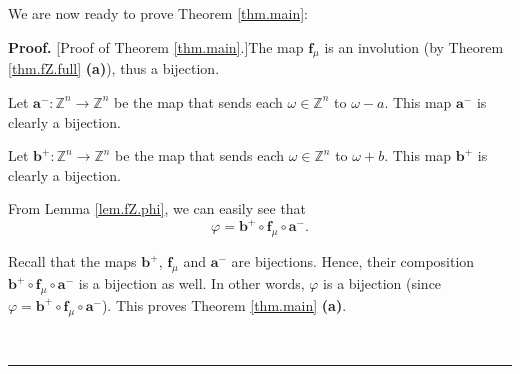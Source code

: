 \documentclass[numbers=enddot,12pt,final,onecolumn,notitlepage]{scrartcl}%
\theoremstyle{definition}
\newenvironment{proof}[1][Proof]{\noindent\textbf{#1.} }{\ \rule{0.5em}{0.5em}}
\newenvironment{verlong}{}{}
\begin{document}
We are now ready to prove Theorem \ref{thm.main}:

\begin{proof}
[Proof of Theorem \ref{thm.main}.]The map $\mathbf{f}_{\mu}$ is an involution
(by Theorem \ref{thm.fZ.full} \textbf{(a)}), thus a bijection.

Let $\mathbf{a}^{-}:\mathbb{Z}^{n}\rightarrow\mathbb{Z}^{n}$ be the map that
sends each $\omega\in\mathbb{Z}^{n}$ to $\omega-a$. This map $\mathbf{a}^{-}$
is clearly a bijection.

Let $\mathbf{b}^{+}:\mathbb{Z}^{n}\rightarrow\mathbb{Z}^{n}$ be the map that
sends each $\omega\in\mathbb{Z}^{n}$ to $\omega+b$. This map $\mathbf{b}^{+}$
is clearly a bijection.

From Lemma \ref{lem.fZ.phi}, we can easily see that%
\[
\varphi=\mathbf{b}^{+}\circ\mathbf{f}_{\mu}\circ\mathbf{a}^{-}.
\]


\begin{verlong}
[\textit{Proof:} Let $\omega\in\mathbb{Z}^{n}$. Then, the definition of
$\mathbf{a}^{-}$ yields $\mathbf{a}^{-}\left(  \omega\right)  =\omega-a$.
Hence, $\omega-a=\mathbf{a}^{-}\left(  \omega\right)  $. But Lemma
\ref{lem.fZ.phi} yields
\begin{align*}
\varphi\left(  \omega\right)   &  =\mathbf{f}_{\mu}\left(  \omega-a\right)
+b=\mathbf{b}^{+}\left(  \mathbf{f}_{\mu}\left(  \underbrace{\omega
-a}_{=\mathbf{a}^{-}\left(  \omega\right)  }\right)  \right) \\
&  \ \ \ \ \ \ \ \ \ \ \left(  \text{since the definition of }\mathbf{b}%
^{+}\text{ yields }\mathbf{b}^{+}\left(  \mathbf{f}_{\mu}\left(
\omega-a\right)  \right)  =\mathbf{f}_{\mu}\left(  \omega-a\right)  +b\right)
\\
&  =\mathbf{b}^{+}\left(  \mathbf{f}_{\mu}\left(  \mathbf{a}^{-}\left(
\omega\right)  \right)  \right)  =\left(  \mathbf{b}^{+}\circ\mathbf{f}_{\mu
}\circ\mathbf{a}^{-}\right)  \left(  \omega\right)  .
\end{align*}


Forget that we fixed $\omega$. Thus we have shown that $\varphi\left(
\omega\right)  =\left(  \mathbf{b}^{+}\circ\mathbf{f}_{\mu}\circ\mathbf{a}%
^{-}\right)  \left(  \omega\right)  $ for each $\omega\in\mathbb{Z}^{n}$. In
other words, $\varphi=\mathbf{b}^{+}\circ\mathbf{f}_{\mu}\circ\mathbf{a}^{-}$, qed.]
\end{verlong}

Recall that the maps $\mathbf{b}^{+}$, $\mathbf{f}_{\mu}$ and $\mathbf{a}^{-}$
are bijections. Hence, their composition $\mathbf{b}^{+}\circ\mathbf{f}_{\mu
}\circ\mathbf{a}^{-}$ is a bijection as well. In other words, $\varphi$ is a
bijection (since $\varphi=\mathbf{b}^{+}\circ\mathbf{f}_{\mu}\circ
\mathbf{a}^{-}$). This proves Theorem \ref{thm.main} \textbf{(a)}.


\end{proof}
\end{document}
